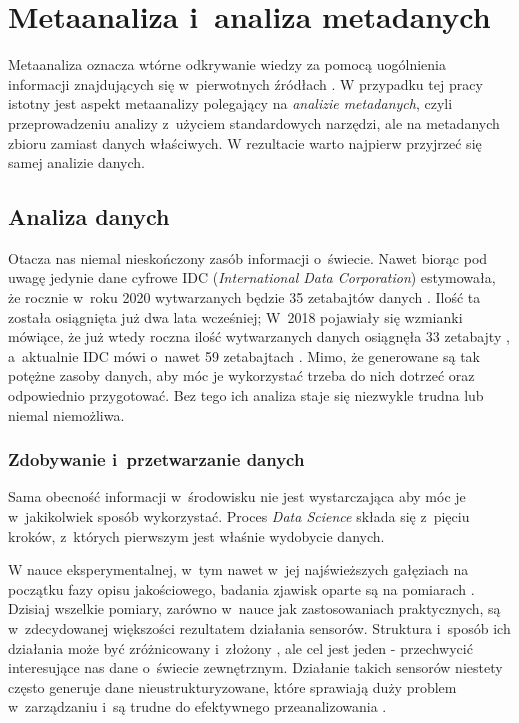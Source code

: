 \chapter{Metaanaliza i~analiza metadanych}

Metaanaliza oznacza wtórne odkrywanie wiedzy za pomocą uogólnienia informacji znajdujących się w~pierwotnych źródłach \cite{higgins2019cochrane}.
W przypadku tej pracy istotny jest aspekt metaanalizy polegający na \textit{analizie metadanych}, czyli przeprowadzeniu analizy z~użyciem standardowych narzędzi, ale na metadanych zbioru zamiast danych właściwych.
W rezultacie warto najpierw przyjrzeć się samej analizie danych.

\section{Analiza danych}

Otacza nas niemal nieskończony zasób informacji o~świecie.
Nawet biorąc pod uwagę jedynie dane cyfrowe IDC (\textit{International Data Corporation}) estymowała, że rocznie w~roku 2020 wytwarzanych będzie 35 zetabajtów danych \cite{tien2013big}.
Ilość ta została osiągnięta już dwa lata wcześniej; W~2018 pojawiały się wzmianki mówiące, że już wtedy roczna ilość wytwarzanych danych osiągnęła 33 zetabajty \cite{Patrizio:2018}, a~aktualnie IDC mówi o~nawet 59 zetabajtach \cite{IDC:2020}.
Mimo, że generowane są tak potężne zasoby danych, aby móc je wykorzystać trzeba do nich dotrzeć oraz odpowiednio przygotować.
Bez tego ich analiza staje się niezwykle trudna lub niemal niemożliwa.

	\subsection{Zdobywanie i~przetwarzanie danych}
	Sama obecność informacji w~środowisku nie jest wystarczająca aby móc je w~jakikolwiek sposób wykorzystać.
	Proces \textit{Data Science} składa się z~pięciu kroków, z~których pierwszym jest właśnie wydobycie danych.

	W nauce eksperymentalnej, w~tym nawet w~jej najświeższych gałęziach na początku fazy opisu jakościowego, badania zjawisk oparte są na pomiarach \cite{brandt1998data}.
	Dzisiaj wszelkie pomiary, zarówno w~nauce jak zastosowaniach praktycznych, są w~zdecydowanej większości rezultatem działania sensorów.
	Struktura i~sposób ich działania może być zróżnicowany i~złożony \cite{deshpande2004model,boyer2009scada}, ale cel jest jeden - przechwycić interesujące nas dane o~świecie zewnętrznym.
	Działanie takich sensorów niestety często generuje dane nieustrukturyzowane, które sprawiają duży problem w~zarządzaniu i~są trudne do efektywnego przeanalizowania \cite{blumberg2003problem}.

